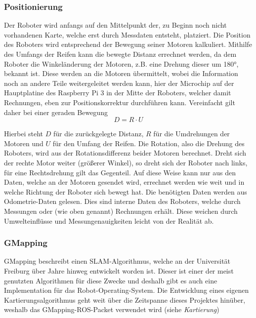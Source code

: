 {{		\subsubsection{Positionierung}
		{
			Der Roboter wird anfangs auf den Mittelpunkt der, zu Beginn noch nicht vorhandenen Karte, welche erst durch Messdaten entsteht, platziert. Die Position des Roboters wird entsprechend der Bewegung seiner Motoren kalkuliert. Mithilfe des Umfangs der Reifen kann die bewegte Distanz errechnet werden, da dem Roboter die Winkeländerung der Motoren, z.B. eine Drehung dieser um 180°, bekannt ist. Diese werden an die Motoren übermittelt, wobei die Information noch an andere Teile weitergeleitet werden kann, hier der Microchip auf der Hauptplatine des Raspberry Pi 3 in der Mitte der Roboters, welcher damit Rechnungen, eben zur Positionskorrektur durchführen kann. Vereinfacht gilt daher bei einer geraden Bewegung
			\begin{equation}
				D = R \cdot U
			\end{equation} 
			
			Hierbei steht $D$ für die zurückgelegte Distanz, $R$ für die Umdrehungen der Motoren und $U$ für den Umfang der Reifen. Die Rotation, also die Drehung des Roboters, wird aus der Rotationsdifferenz beider Motoren berechnet. Dreht sich der rechte Motor weiter (größerer Winkel), so dreht sich der Roboter nach links, für eine Rechtsdrehung gilt das Gegenteil.
			Auf diese Weise kann nur aus den Daten, welche an der Motoren gesendet wird, errechnet werden wie weit und in welche Richtung der Roboter sich bewegt hat.
			Die benötigten Daten werden aus Odometrie-Daten gelesen. Dies sind interne Daten des Roboters, welche durch Messungen oder (wie oben genannt) Rechnungen erhält. Diese weichen durch Umwelteinflüsse und Messungenauigkeiten leicht von der Realität ab.
			
			
		\subsubsection{GMapping}
		{
			GMapping beschreibt einen SLAM-Algorithmus, welche an der Universität Freiburg über Jahre hinweg entwickelt worden ist. Dieser ist einer der  meist genutzten Algorithmen für diese Zwecke und deshalb gibt es auch eine Implementation für das Robot-Operating-System. Die Entwicklung eines eigenen Kartierungsalgorithmus geht weit über die Zeitspanne dieses Projektes hinüber, weshalb das GMapping-ROS-Packet verwendet wird (siehe \textit{Kartierung}) %
			
}}}}
